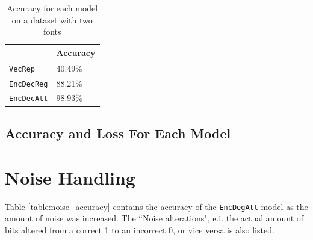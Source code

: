\begin{table}[H]
    \centering
    \begin{tabular}{|l|l|}
        \hline 
                                        & \textbf{Accuracy}         \\ \hline
        {\tt VecRep }                   & 40.49\%                   \\ \hline
        {\tt EncDecReg}                 & 88.21\%                   \\ \hline
        {\tt EncDecAtt}                 & 98.93\%                   \\ \hline
    \end{tabular}
    \caption{Accuracy for each model on a dataset with two fonts}
    \label{table:accuracy_two_fonts}
\end{table}

\subsection{Accuracy and Loss For Each Model}


\section{Noise Handling}
Table \ref{table:noise_accuracy} contains the accuracy of the {\tt EncDegAtt} model as the amount of noise was increased. The ``Noise alterations", e.i. the actual amount of bits altered from a correct 1 to an incorrect 0, or vice versa is also listed. 

